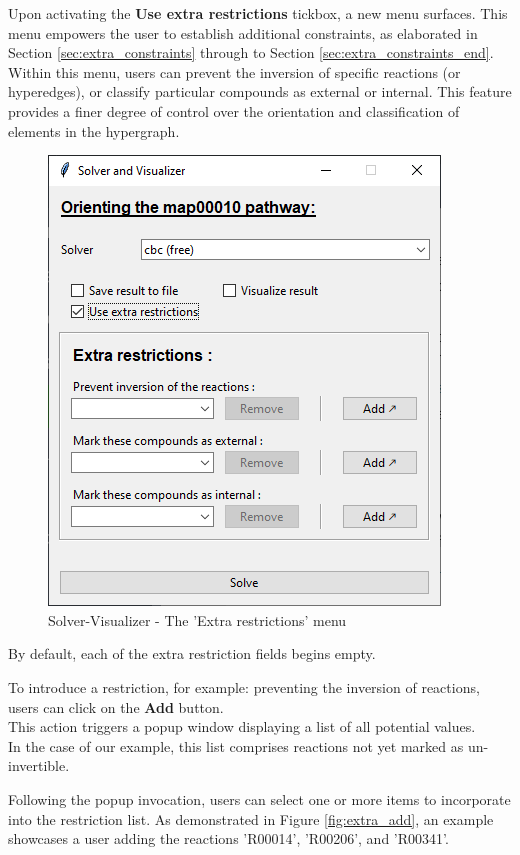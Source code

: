 Upon activating the \textbf{Use extra restrictions} tickbox, a new menu surfaces. This menu empowers the user to establish additional constraints, as elaborated in Section \ref{sec:extra_constraints} through to Section \ref{sec:extra_constraints_end}. Within this menu, users can prevent the inversion of specific reactions (or hyperedges), or classify particular compounds as external or internal. This feature provides a finer degree of control over the orientation and classification of elements in the hypergraph.

\begin{figure}[H]
    \centering
    \includegraphics[width=0.6\linewidth]{Design of the User Interface/extra_constraints.png}
    \caption{Solver-Visualizer - The 'Extra restrictions' menu}
    \label{fig:enter-label}
\end{figure}

By default, each of the extra restriction fields begins empty.

To introduce a restriction, for example: preventing the inversion of reactions, users can click on the \textbf{Add} button. \\
This action triggers a popup window displaying a list of all potential values.\\In the case of our example, this list comprises reactions not yet marked as un-invertible. 

Following the popup invocation, users can select one or more items to incorporate into the restriction list. As demonstrated in Figure \ref{fig:extra_add}, an example showcases a user adding the reactions 'R00014', 'R00206', and 'R00341'.

